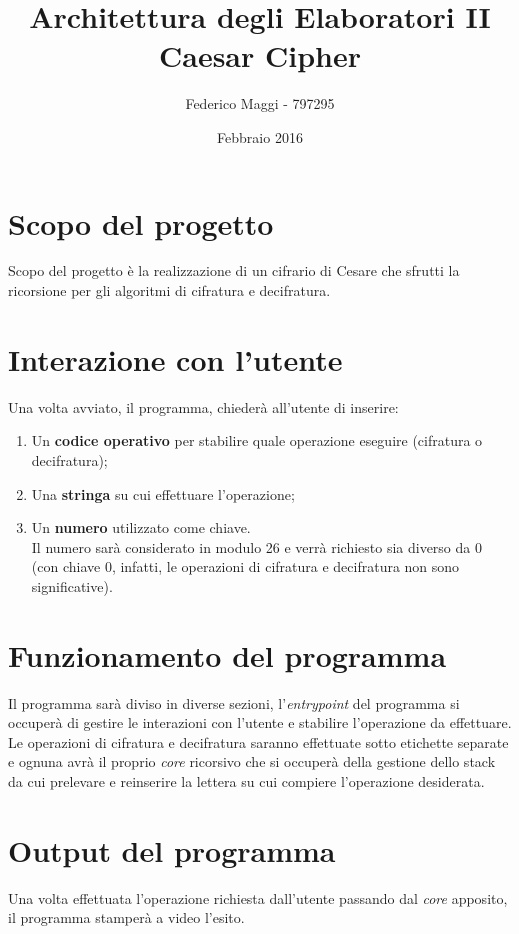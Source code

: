 \documentclass[11pt]{article}
\title{Architettura degli Elaboratori II \\ Caesar Cipher}
\author{Federico Maggi - 797295}
\date{Febbraio 2016}
\begin{document}
\maketitle
\clearpage

\section{Scopo del progetto}
Scopo del progetto \`e la realizzazione di un cifrario di Cesare che sfrutti la ricorsione per gli algoritmi di cifratura e decifratura.

\section{Interazione con l'utente}
Una volta avviato, il programma, chieder\`a all'utente di inserire:

\begin{enumerate}
	\item Un \textbf{codice operativo} per stabilire quale operazione eseguire (cifratura o decifratura);
	\item Una \textbf{stringa} su cui effettuare l'operazione;
	\item Un \textbf{numero} utilizzato come chiave.\\Il numero sar\`a considerato in modulo 26 e verr\`a richiesto sia diverso da 0 (con chiave 0, infatti, le operazioni di cifratura e decifratura non sono significative).
\end{enumerate}

\section{Funzionamento del programma}
Il programma sar\`a diviso in diverse sezioni, l'\textit{entrypoint} del programma si occuper\`a di gestire le interazioni con l'utente e stabilire l'operazione da effettuare. Le operazioni di cifratura e decifratura saranno effettuate sotto etichette separate e ognuna avr\`a il proprio \textit{core} ricorsivo che si occuper\`a della gestione dello stack da cui prelevare e reinserire la lettera su cui compiere l'operazione desiderata. 

\section{Output del programma}
Una volta effettuata l'operazione richiesta dall'utente passando dal \textit{core} apposito, il programma stamper\`a a video l'esito.
\end{document}
